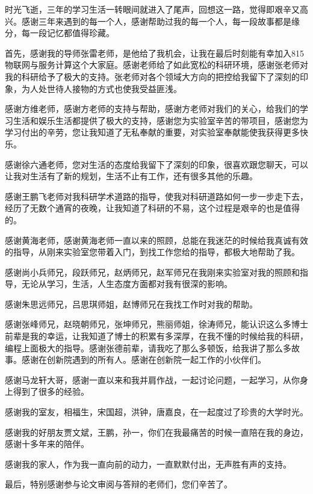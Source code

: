 \begin{acknowledgement}
时光飞逝，三年的学习生活一转眼间就进入了尾声，回想这一路，觉得即艰辛又高兴。感谢三年来遇到的每一个人，感谢帮助过我的每一个人，每一段故事都是缘分，每一段记忆都值得珍藏。

首先，感谢我的导师张雷老师，是他给了我机会，让我在最后时刻能有幸加入815物联网与服务计算这个大家庭。感谢老师给了如此宽松的科研环境，感谢张老师对我的科研给予了极大的支持。张老师对各个领域大方向的把控给我留下了深刻的印象，为人处世待人接物的方式也使我受益匪浅。

感谢方维老师，感谢方老师的支持与帮助，感谢方老师对我们的关心，给我们的学习生活和娱乐生活都提供了极大的支持，感谢您为实验室辛苦的带项目，感谢您为学习付出的辛劳，您让我知道了无私奉献的重要，对实验室奉献能使我获得更多快乐。

感谢徐六通老师，您对生活的态度给我留下了深刻的印象，很喜欢跟您聊天，可以让我对生活有了新的规划，生活不止有工作，还有很多其他的乐趣。

感谢王鹏飞老师对我科研学术道路的指导，使我对科研道路如何一步一步走下去，经历了无数个通宵的夜晚，让我知道了科研的不易，这个过程是艰辛的也是值得的。

感谢黄海老师，感谢黄海老师一直以来的照顾，总能在我迷茫的时候给我真诚有效的指导，从刚来实验室您带着入门，到找工作您给的指导，都极大地帮助了我。

感谢尚小兵师兄，段跃师兄，赵炳师兄，赵军师兄在我刚来实验室对我的照顾和指导，无论从学习，生活，人生态度方面都对我有很深的影响。

感谢朱思远师兄，吕思琪师姐，赵博师兄在我找工作时对我的帮助。

感谢张峰师兄，赵晓朝师兄，张坤师兄，熊丽师姐，徐涛师兄，能认识这么多博士前辈是我的幸运，让我知道了博士的积累有多深厚，在我不懂的时候给我的科研，编程上面极大的指导。感谢张德前辈，请我吃了那么多顿饭，给我讲了那么多故事。感谢在创新院遇到的所有人。感谢在创新院一起工作的小伙伴们。

感谢马龙轩大哥，感谢一直以来和我并肩作战，一起讨论问题，一起学习，从你身上得到了很多的经验。

感谢我的室友，相福生，宋国超，洪钟，唐嘉良，在一起度过了珍贵的大学时光。

感谢我的好朋友贾文斌，王鹏，孙一，你们在我最痛苦的时候一直陪在我的身边，感谢十多年来的陪伴。

感谢我的家人，作为我一直向前的动力，一直默默付出，无声胜有声的支持。

最后，特别感谢参与论文审阅与答辩的老师们，您们辛苦了。


\end{acknowledgement}